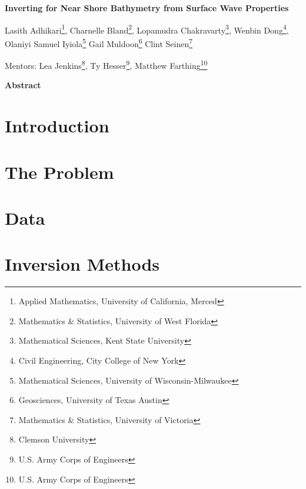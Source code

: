 \documentclass[12pt]{article}
\begin{document}
\centerline{\large \bf Inverting for Near Shore Bathymetry from Surface Wave Properties}

\vspace{.1truein}

\def\thefootnote{\arabic{footnote}}
\begin{center}
	Lasith Adhikari\footnote{Applied Mathematics, University of California, Merced},
	Charnelle Bland\footnote{Mathematics \& Statistics,  University of West Florida},
  Lopamudra Chakravarty\footnote{Mathematical Sciences, Kent State University},
  Wenbin Dong\footnote{Civil Engineering, City College of New York},\\
 Olaniyi Samuel Iyiola\footnote{Mathematical Sciences, University of Wisconsin-Milwaukee}
 Gail Muldoon\footnote{Geosciences, University of Texas Austin}
 Clint Seinen\footnote{Mathematics \& Statistics, University of Victoria}

\end{center}


\begin{center}
Mentors: Lea Jenkins\footnote{Clemson University},
Ty Hesser\footnote{U.S. Army Corps of Engineers},
Matthew Farthing\footnote{U.S. Army Corps of Engineers}
\end{center}


\vspace{.3truein}
\centerline{\bf Abstract}



\section{Introduction}


\section{The Problem}


\section{Data}





\section{Inversion Methods} \label{inv_techniques}


\end{document}
